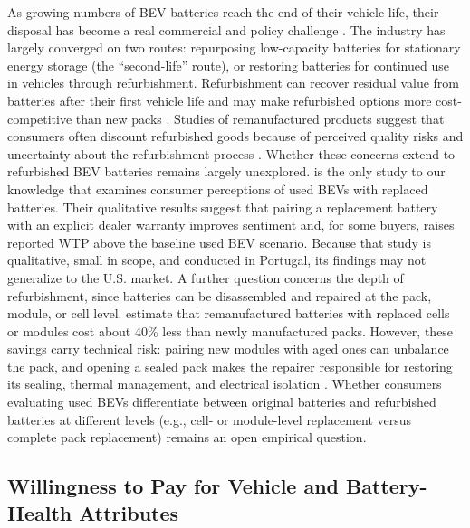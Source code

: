 \documentclass[a4paper,fleqn]{cas-sc}   %
\begin{document}
As growing numbers of BEV batteries reach the end of their vehicle life, their disposal has become a real commercial and policy challenge \parencite{skeeteEVentHorizonBattery2020, tankouScalingReuseRecycling2023}. The industry has largely converged on two routes: repurposing low-capacity batteries for stationary energy storage (the ``second-life'' route), or restoring batteries for continued use in vehicles through refurbishment. Refurbishment can recover residual value from batteries after their first vehicle life and may make refurbished options more cost-competitive than new packs \parencite{jiaoBusinessModelsSustainability2016, shaikhSystemDynamicsCosting2023}. Studies of remanufactured products suggest that consumers often discount refurbished goods because of perceived quality risks and uncertainty about the refurbishment process \parencite{abbeyRemanufacturedProductsClosedLoop2015}. Whether these concerns extend to refurbished BEV batteries remains largely unexplored. \textcite{pedrosaSecondhandElectricalVehicles2018} is the only study to our knowledge that examines consumer perceptions of used BEVs with replaced batteries. Their qualitative results suggest that pairing a replacement battery with an explicit dealer warranty improves sentiment and, for some buyers, raises reported WTP above the baseline used BEV scenario. Because that study is qualitative, small in scope, and conducted in Portugal, its findings may not generalize to the U.S. market. A further question concerns the depth of refurbishment, since batteries can be disassembled and repaired at the pack, module, or cell level. \textcite{fosterFeasibilityAssessmentRemanufacturing2014} estimate that remanufactured batteries with replaced cells or modules cost about 40\% less than newly manufactured packs. However, these savings carry technical risk: pairing new modules with aged ones can unbalance the pack, and opening a sealed pack makes the repairer responsible for restoring its sealing, thermal management, and electrical isolation \parencite{staffEVBatteryRepair2026}. Whether consumers evaluating used BEVs differentiate between original batteries and refurbished batteries at different levels (e.g., cell- or module-level replacement versus complete pack replacement) remains an open empirical question.


\subsection{Willingness to Pay for Vehicle and Battery-Health Attributes}
\end{document}
